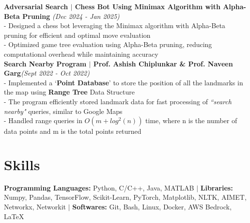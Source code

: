 \documentclass[a4paper,10pt]{article}
\begin{document}
\textbf{Adversarial Search $\mid$ Chess Bot Using Minimax Algorithm with Alpha-Beta Pruning} \hfill\textit{(Dec 2024 - Jan 2025)} \href{https://github.com/khushvind/Adversarial-Search--Chess-Bot-Using-Minimax-Algorithm-with-Alpha-Beta-Pruning}{\raisebox{-0.05\height}\faGithub}\\
- Designed a chess bot leveraging the Minimax algorithm with Alpha-Beta pruning for efficient and optimal move evaluation\\
- Optimized game tree evaluation using Alpha-Beta pruning, reducing computational overhead while maintaining accuracy\\
\textbf{Search Nearby Program $\mid$ Prof. Ashish Chiplunkar \& Prof. Naveen Garg}\hfill\textit{(Sept 2022 - Oct 2022)} \href{https://github.com/khushvind/COL106-Assignments/tree/main/Assignment%203}{\raisebox{-0.05\height}\faGithub}\\
- Implemented a `\textbf{Point Database}' to store the position of all the landmarks in the map using \textbf{Range Tree} Data Structure\\
- The program efficiently stored landmark data for fast processing of \textit{``search nearby"} queries, similar to Google Maps\\
- Handled range queries in $O(m + log^2(n))$ time, where n is the number of data points and m is the total points returned

\section{\textbf{Skills}}
\textbf{Programming Languages:} Python, C/C++, Java, MATLAB $\mid$ \textbf{Libraries:} Numpy, Pandas, TensorFlow, Scikit-Learn, PyTorch, Matplotlib, NLTK, AIMET, Networkx, Networkit $\mid$ \textbf{Softwares:} Git, Bash, Linux, Docker, AWS Bedrock, LaTeX
\end{document}
